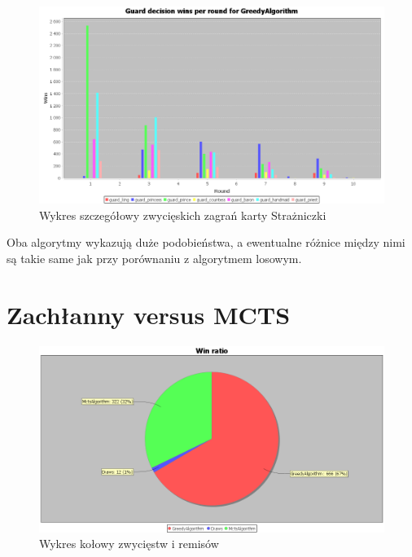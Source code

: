 \begin{figure}[H]
	\centering
	\includegraphics[width=\textwidth]{Resources/MirrorMmVsG/GVsMmGuardDecision.PNG}
	\caption{Wykres szczegółowy zwycięskich zagrań karty Strażniczki} 
	\label{fig:GVsMmGuardDecision}
\end{figure}


Oba algorytmy wykazują duże podobieństwa, a ewentualne różnice między nimi są takie same jak przy porównaniu z algorytmem losowym.
\clearpage
\section{Zachłanny versus MCTS}

\begin{figure}[H]
	\centering
	\includegraphics[width=\textwidth]{Resources/MirrorMctsVG/GVsMctsWin.PNG}
	\caption{Wykres kołowy zwycięstw i remisów} 
	\label{fig:GVsMctsWin}
\end{figure}

